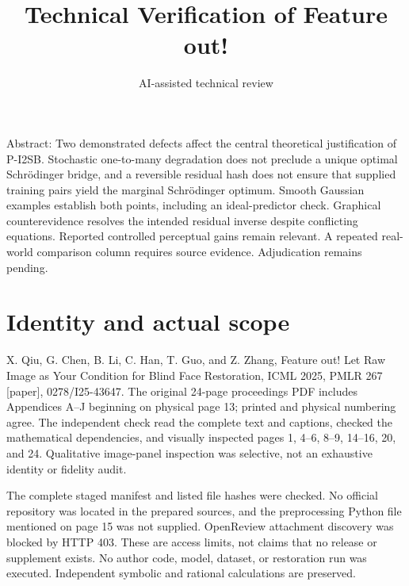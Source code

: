 \documentclass[10pt]{article}
\title{Technical Verification of Feature out!}
\author{AI-assisted technical review}
\date{}
\begin{document}
\maketitle
Abstract: Two demonstrated defects affect the central theoretical justification of P-I2SB. Stochastic one-to-many degradation does not preclude a unique optimal Schrödinger bridge, and a reversible residual hash does not ensure that supplied training pairs yield the marginal Schrödinger optimum. Smooth Gaussian examples establish both points, including an ideal-predictor check. Graphical counterevidence resolves the intended residual inverse despite conflicting equations. Reported controlled perceptual gains remain relevant. A repeated real-world comparison column requires source evidence. Adjudication remains pending.\par
\section*{Identity and actual scope}
X. Qiu, G. Chen, B. Li, C. Han, T. Guo, and Z. Zhang, Feature out! Let Raw Image as Your Condition for Blind Face Restoration, ICML 2025, PMLR 267 [paper], 0278/I25-43647. The original 24-page proceedings PDF includes Appendices A–J beginning on physical page 13; printed and physical numbering agree. The independent check read the complete text and captions, checked the mathematical dependencies, and visually inspected pages 1, 4–6, 8–9, 14–16, 20, and 24. Qualitative image-panel inspection was selective, not an exhaustive identity or fidelity audit.\par
The complete staged manifest and listed file hashes were checked. No official repository was located in the prepared sources, and the preprocessing Python file mentioned on page 15 was not supplied. OpenReview attachment discovery was blocked by HTTP 403. These are access limits, not claims that no release or supplement exists. No author code, model, dataset, or restoration run was executed. Independent symbolic and rational calculations are preserved.\par
\end{document}
